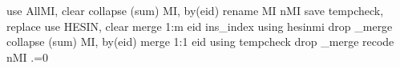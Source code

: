 use AllMI, clear
collapse (sum) MI, by(eid)
rename MI nMI
save tempcheck, replace
use HESIN, clear
merge 1:m eid ins_index using hesinmi
drop _merge
collapse (sum) MI, by(eid)
merge 1:1 eid using tempcheck
drop _merge
recode nMI .=0
